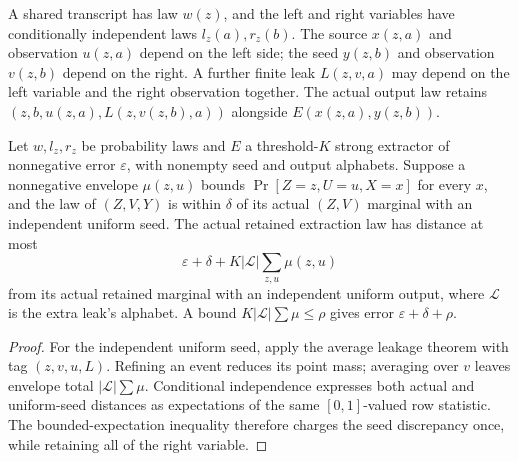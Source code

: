 \begin{definition}
  \label{def:lowerbounds-algebraic-two-sided-laws}
  \leanok
  A shared transcript has law $w(z)$, and the left and right variables
  have conditionally independent laws $l_z(a),r_z(b)$. The source
  $x(z,a)$ and observation $u(z,a)$ depend on the left side; the seed
  $y(z,b)$ and observation $v(z,b)$ depend on the right. A further
  finite leak $L(z,v,a)$ may depend on the left variable and the right
  observation together. The actual output law retains
  $(z,b,u(z,a),L(z,v(z,b),a))$ alongside $E(x(z,a),y(z,b))$.
\end{definition}

\begin{theorem}
  \label{thm:lowerbounds-algebraic-two-sided-leakage}
  \leanok
  Let $w,l_z,r_z$ be probability laws and $E$ a threshold-$K$ strong
  extractor of nonnegative error $\varepsilon$, with nonempty seed and
  output alphabets. Suppose a nonnegative envelope $\mu(z,u)$ bounds
  $\Pr[Z=z,U=u,X=x]$ for every $x$, and the law of $(Z,V,Y)$ is within
  $\delta$ of its actual $(Z,V)$ marginal with an independent uniform
  seed. The actual retained extraction law has distance at most
  \[
    \varepsilon+\delta+K|\mathcal L|\sum_{z,u}\mu(z,u)
  \]
  from its actual retained marginal with an independent uniform output,
  where $\mathcal L$ is the extra leak's alphabet. A bound
  $K|\mathcal L|\sum\mu\le\rho$ gives error $\varepsilon+\delta+\rho$.
\end{theorem}
\begin{proof}
  \leanok
  For the independent uniform seed, apply the average leakage theorem
  with tag $(z,v,u,L)$. Refining an event reduces its point mass;
  averaging over $v$ leaves envelope total $|\mathcal L|\sum\mu$.
  Conditional independence expresses both actual and uniform-seed
  distances as expectations of the same $[0,1]$-valued row statistic.
  The bounded-expectation inequality therefore charges the seed
  discrepancy once, while retaining all of the right variable.
\end{proof}

